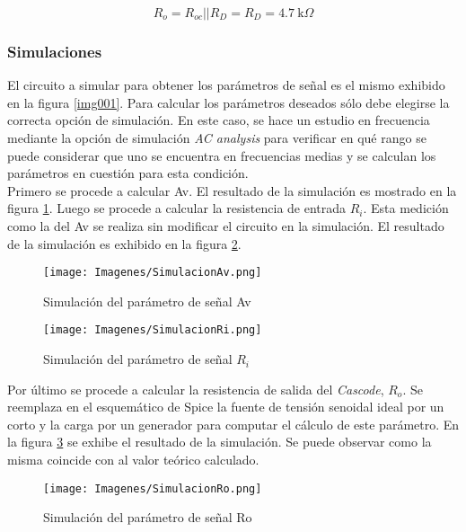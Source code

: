 \documentclass[a4paper,10pt]{article}
\begin{document}
				\begin{equation}	 
					R_o = R_{oc} || R_{D} = R_{D} = 4.7~\text{k}\Omega \label{eq007}
				\end{equation} 

			\subsubsection{Simulaciones}
				El circuito a simular para obtener los parámetros de señal es el mismo exhibido en la figura \ref{img001}. Para calcular los parámetros deseados
				sólo debe elegirse la correcta opción de simulación. En este caso, se hace un estudio en frecuencia mediante la opción de simulación 
				\emph{AC analysis} para verificar en qué rango se puede considerar que uno se encuentra en frecuencias medias y se calculan los parámetros en 
				cuestión para esta condición. \\
				\indent Primero se procede a calcular Av. El resultado de la simulación es mostrado en la figura \ref{img002}. Luego se procede a calcular la 
				resistencia de entrada $R_i$. Esta medición como la del Av se realiza sin modificar el circuito en la simulación. El resultado de la simulación
				es exhibido en la figura \ref{img003}. 

				\begin{figure}[!htb]
					\centering
						\texttt{[image: Imagenes/SimulacionAv.png]}
						\caption{Simulación del parámetro de señal Av} \label{img002}
				\end{figure}
		
				\begin{figure}[!htb]
					\centering
						\texttt{[image: Imagenes/SimulacionRi.png]}
						\caption{Simulación del parámetro de señal $R_i$} \label{img003}
				\end{figure}

				Por último se procede a calcular la resistencia de salida del \emph{Cascode}, $R_o$. Se reemplaza en el esquemático de Spice la fuente de tensión 
				senoidal ideal por un corto y la carga por un generador para computar el cálculo de este parámetro. En la figura \ref{img004} se exhibe el 
				resultado de la simulación. Se puede observar como la misma coincide con al valor teórico calculado.  

				\begin{figure}[!htb]
					\centering
						\texttt{[image: Imagenes/SimulacionRo.png]}
						\caption{Simulación del parámetro de señal Ro} \label{img004}
				\end{figure}
\end{document}
